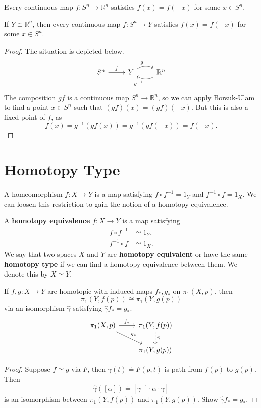 \documentclass[twoside,10pt]{report}
\begin{document}
\begin{thrm}
	Every continuous map $f:S^{n}\to \mathbb{R}^{n}$ satisfies $f(x)=f(-x)$ for some $x \in S^{n}$.
\end{thrm}

\begin{cor}
	If $Y \cong \mathbb{R}^{n}$, then every continuous map $f:S^{n}\to Y$ satisfies $f(x)=f(-x)$ for some $x \in S^{n}$.
\end{cor}
\begin{proof}
	The situation is depicted below.
	\[
	\begin{tikzcd}
		S^{n}\rar{f}&Y\rar[bend left]{g}&\mathbb{R}^{n}\lar[bend left]{g^{-1}}
	\end{tikzcd}
\] The composition $gf$ is a continuous map $S^{n}\to \mathbb{R}^{n}$, so we can apply Borsuk-Ulam to find a point $x \in S^{n}$ such that $(gf)(x)=(gf)(-x)$. But this is also a fixed point of $f$, as
\[
	f(x) = g^{-1}(gf(x)) = g^{-1}(gf(-x)) = f(-x).
\] 
\end{proof}


\section{Homotopy Type}

A homeomorphism $f:X\to Y$ is a map satisfying $f \circ f^{-1}=1_{Y}$ and $f^{-1} \circ f=1_{X}$. We can loosen this restriction to gain the notion of a homotopy equivalence.

\begin{defn}[]
	A \textbf{homotopy equivalence} $f:X\to Y$ is a map satisfying
\begin{align*}
	f \circ f^{-1} &\simeq 1_{Y},\\
	f^{-1} \circ f &\simeq 1_{X}.
\end{align*}
We say that two spaces $X$ and $Y$ are \textbf{homotopy equivalent} or have the same \textbf{homotopy type} if we can find a homotopy equivalence between them. We denote this by $X \simeq Y$.
\end{defn}

\begin{prop}
	If $f,g:X\to Y$ are homotopic with induced maps $f_{*},g_{*}$ on $\pi_1(X,p)$, then
	\[
		\pi_1(Y,f(p)) \cong \pi_1(Y,g(p))
	\] via an isomorphism $\hat{\gamma}$ satisfying $\hat{\gamma}f_{*}=g_{*}$.
\[
\begin{tikzcd}
	\pi_1(X,p)\rar{f_{*}}\arrow[dr,"g_{*}"]&\pi_1(Y,f(p))\dar[dashed]{\hat{\gamma}}\\
			     &\pi_1(Y,g(p))
\end{tikzcd}
\] 
\end{prop}
\begin{proof}
	Suppose $f \simeq g$ via $F$, then $\gamma(t) \doteq F(p,t)$ is path from $f(p)$ to $g(p)$. Then
	\[
		\hat{\gamma}([\alpha]) \doteq [\gamma^{-1} \cdot \alpha \cdot \gamma]
	\] is an isomorphism between $\pi_1(Y,f(p))$ and $\pi_1(Y,g(p))$. {\color{red}Show $\hat{\gamma}f_{*}=g_{*}$.}
\end{proof}
\end{document}
